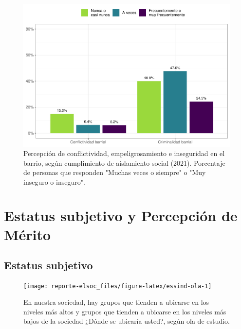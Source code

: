 \documentclass[
  12pt,
  openany]{book}
\begin{document}
\begin{figure}

{\centering \includegraphics{reporte-elsoc_files/figure-latex/dist-barrio-1} 

}

\caption{Percepción de conflictividad, empeligrosamiento e inseguridad en el barrio, según cumplimiento de aislamiento social (2021). Porcentaje de personas que responden "Muchas veces o siempre" o "Muy inseguro o inseguro".}\label{fig:dist-barrio}
\end{figure}

\hypertarget{estatus-subjetivo-y-percepciuxf3n-de-muxe9rito}{%
\chapter{Estatus subjetivo y Percepción de Mérito}\label{estatus-subjetivo-y-percepciuxf3n-de-muxe9rito}}

\hypertarget{estatus-subjetivo}{%
\section{Estatus subjetivo}\label{estatus-subjetivo}}

\begin{figure}

{\centering \texttt{[image: reporte-elsoc\_files/figure-latex/essind-ola-1]} 

}

\caption{En nuestra sociedad, hay grupos que tienden a ubicarse en los niveles más altos y grupos que tienden a ubicarse en los niveles más bajos de la sociedad ¿Dónde se ubicaría usted?, según ola de estudio.}\label{fig:essind-ola}
\end{figure}
\end{document}
